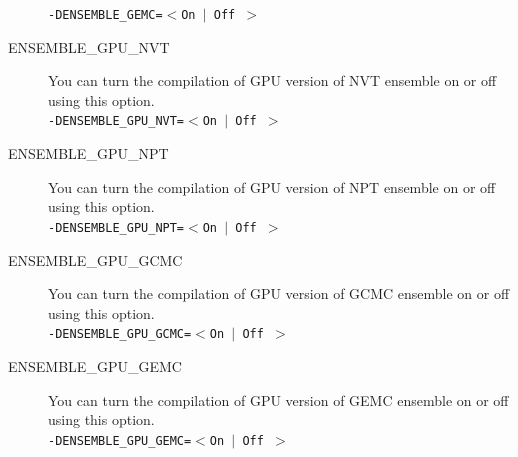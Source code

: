 \begin{description}
\texttt{-DENSEMBLE\_GEMC=$<$On $\mid$ Off $>$}
\item [ENSEMBLE\_GPU\_NVT] You can turn the compilation of GPU version of NVT ensemble on or off using this option.\\
\texttt{-DENSEMBLE\_GPU\_NVT=$<$On $\mid$ Off $>$}
\item [ENSEMBLE\_GPU\_NPT] You can turn the compilation of GPU version of NPT ensemble on or off using this option.\\
\texttt{-DENSEMBLE\_GPU\_NPT=$<$On $\mid$ Off $>$}
\item [ENSEMBLE\_GPU\_GCMC] You can turn the compilation of GPU version of GCMC ensemble on or off using this option.\\
\texttt{-DENSEMBLE\_GPU\_GCMC=$<$On $\mid$ Off $>$}
\item [ENSEMBLE\_GPU\_GEMC] You can turn the compilation of GPU version of GEMC ensemble on or off using this option.\\
\texttt{-DENSEMBLE\_GPU\_GEMC=$<$On $\mid$ Off $>$}
\end{description}
